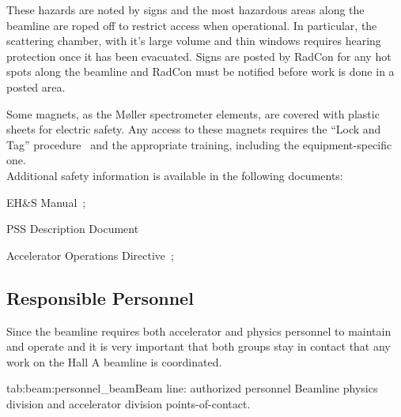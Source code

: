 \begin{safetyen}{0}{0}
These hazards are noted by signs and the most hazardous 
areas along the beamline
are roped off to restrict access when operational.   
In particular, the scattering chamber, with it's large
volume and thin windows requires hearing protection once it has been evacuated.   
Signs are posted by RadCon for any hot spots along the beamline and
RadCon must be notified before work is done in a posted area.

Some magnets, as the M{\o}ller spectrometer elements, are covered with plastic
sheets for electric safety. Any access to these magnets requires
the ``Lock and Tag'' procedure~\cite{EHScebaf} and the appropriate training,
including the equipment-specific one. \\

\noindent{}Additional safety information is available in the following documents:
\begin{list}{--}{\setlength{\itemsep}{-0.15cm}}
  \item EH\&S Manual~\cite{EHScebaf};
  \item PSS Description Document~\cite{PSScebaf}
  \item Accelerator Operations Directive~\cite{AODcebaf};
\end{list}

\subsection{Responsible Personnel}

Since the beamline requires both accelerator and physics personnel to maintain
and operate and it is very important that both groups stay in contact that any 
work on the Hall A beamline is coordinated.

\begin{namestab}{tab:beam:personnel_beam}{Beam line: authorized personnel}{%
   Beamline physics division and accelerator division points-of-contact.}
\end{namestab}
\end{safetyen}

